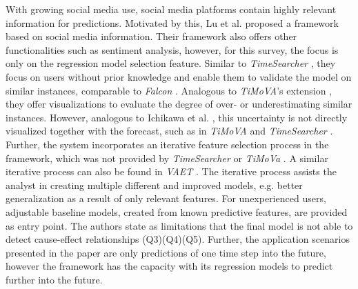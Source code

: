 \documentclass[electronic]{vgtc}             %
\begin{document}
With growing social media use, social media platforms contain highly relevant information for predictions. 
Motivated by this, Lu et al. \cite{lu:2014} proposed a framework based on social media information. 
Their framework also offers other functionalities such as sentiment analysis, however, for this survey, the focus is only on the regression model selection feature.
Similar to \textit{TimeSearcher} \cite{buono:2007}, they focus on users without prior knowledge and enable them to validate the model on similar instances, comparable to \textit{Falcon}  \cite{steed:2017}. 
Analogous to \textit{TiMoVA}'s extension \cite{boegl:2014}, they offer visualizations to evaluate the degree of over- or underestimating similar instances.
However, analogous to Ichikawa et al. \cite{ichikawa:2002}, this uncertainty is not directly visualized together with the forecast, such as in \textit{TiMoVA} \cite{boegl:2013} and \textit{TimeSearcher} \cite{buono:2007}.
Further, the system incorporates an iterative feature selection process in the framework, which was not provided by \textit{TimeSearcher} \cite{buono:2007} or \textit{TiMoVa} \cite{boegl:2013}.
A similar iterative process can also be found in \textit{VAET} \cite{Xie:2014}.
The iterative process assists the analyst in creating multiple different and improved models, e.g. better generalization as a result of only relevant features.
For unexperienced users, adjustable baseline models, created from known predictive features, are provided as entry point.
The authors state as limitations that the final model is not able to detect cause-effect relationships (Q3)(Q4)(Q5). 
Further, the application scenarios presented in the paper are only predictions of one time step into the future, however the framework has the capacity with its regression models to predict further into the future.
\end{document}
